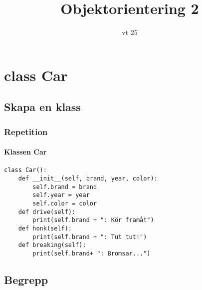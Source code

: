 \documentclass[aspectratio=169]{beamer}
\begin{document}


\title{Objektorientering 2}
\date{vt 25}

\maketitle

\section{class Car}

\subsection{Skapa en klass}

\begin{frame}[fragile]
	\frametitle{Repetition}
	\framesubtitle{Klassen Car}
	
	\begin{lstlisting}
class Car():
    def __init__(self, brand, year, color):
        self.brand = brand
        self.year = year
        self.color = color
    def drive(self):
        print(self.brand + ": Kör framåt")
    def honk(self):
        print(self.brand + ": Tut tut!")
    def breaking(self):
        print(self.brand+ ": Bromsar...")
	\end{lstlisting}
	
\end{frame}

\subsection{Begrepp}
\end{document}
